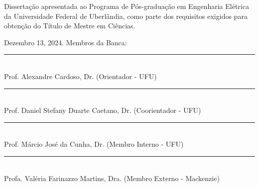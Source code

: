 
\newpage
\thispagestyle{empty}   %
\begin{center}
\ABNTEXchapterfont\large\imprimirautor
\vskip 4cm
\ABNTEXchapterfont\bfseries\Large\imprimirtitulo
\end{center}
\vskip 2cm


\hfill                                                         %
\begin{minipage}{11cm}
Dissertação apresentada ao Programa de Pós-graduação em Engenharia Elétrica da Universidade Federal de Uberlândia, como parte dos requisitos exigidos para obtenção do Título de Mestre em Ciências.

\end{minipage}
\vskip 0.5cm
\noindent  Dezembro 13, 2024.
\vskip 0.5cm
\noindent Membros da Banca:
\vskip 1cm
\vspace{-0.5cm}

\begin{center}
    \rule{7.5cm}{0.4mm}\\
    Prof. Alexandre Cardoso, Dr. (Orientador - UFU)

    \vspace{0.5cm}
    \rule{7.5cm}{0.4mm}\\
    Prof. Daniel Stefany Duarte Caetano, Dr. (Coorientador - UFU)

    \vspace{0.5cm}
    \rule{7.5cm}{0.4mm}\\
    Prof. Márcio José da Cunha, Dr. (Membro Interno - UFU)

    \vspace{0.5cm}
    \rule{7.5cm}{0.4mm}\\
    Profa. Valéria Farinazzo Martins, Dra. (Membro Externo - Mackenzie)
\end{center}